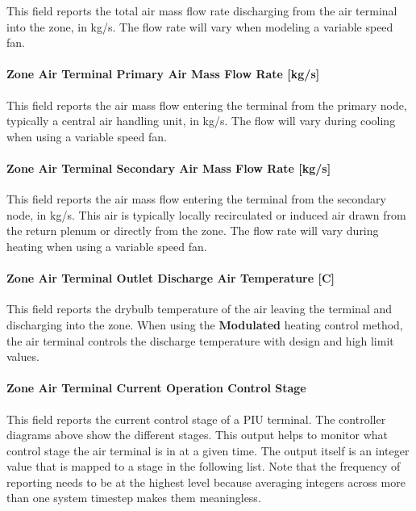 This field reports the total air mass flow rate discharging from the air terminal into the zone, in kg/s. The flow rate will vary when modeling a variable speed fan.

\paragraph{Zone Air Terminal Primary Air Mass Flow Rate {[}kg/s{]}}

This field reports the air mass flow entering the terminal from the primary node, typically a central air handling unit, in kg/s. The flow will vary during cooling when using a variable speed fan.

\paragraph{Zone Air Terminal Secondary Air Mass Flow Rate {[}kg/s{]}}

This field reports the air mass flow entering the terminal from the secondary node, in kg/s. This air is typically locally recirculated or induced air drawn from the return plenum or directly from the zone. The flow rate will vary during heating when using a variable speed fan.

\paragraph{Zone Air Terminal Outlet Discharge Air Temperature {[}C{]}}

This field reports the drybulb temperature of the air leaving the terminal and discharging into the zone. When using the \textbf{Modulated} heating control method, the air terminal controls the discharge temperature with design and high limit values.

\paragraph{Zone Air Terminal Current Operation Control Stage}

This field reports the current control stage of a PIU terminal. The controller diagrams above show the different stages. This output helps to monitor what control stage the air terminal is in at a given time. The output itself is an integer value that is mapped to a stage in the following list. Note that the frequency of reporting needs to be at the highest level because averaging integers across more than one system timestep makes them meaningless.

